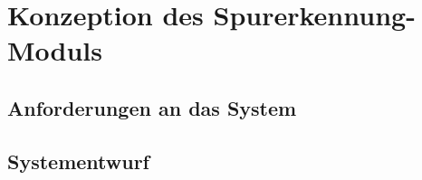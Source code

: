 
\chapter{Konzeption des Spurerkennung-Moduls}
\label{cha:konzeption}



\section{Anforderungen an das System}
\label{sec:requirements}

\section{Systementwurf}
\label{sec:design}
